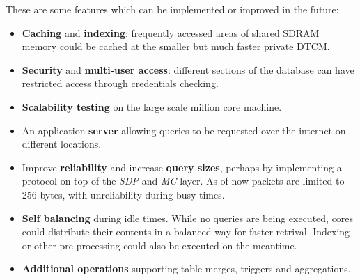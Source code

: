 These are some features which can be implemented or improved in the future:

\begin{itemize}
	\item \textbf{Caching} and \textbf{indexing}: frequently accessed areas of shared SDRAM memory could be cached at the smaller but much faster private DTCM.
	\item \textbf{Security} and \textbf{multi-user access}: different sections of the database can have restricted access through credentials checking.
	\item \textbf{Scalability testing} on the large scale million core machine.
	\item An application \textbf{server} allowing queries to be requested over the internet on different locations.
	\item Improve \textbf{reliability} and increase \textbf{query sizes}, perhaps by implementing a protocol on top of the \textit{SDP} and \textit{MC} layer. As of now packets are limited to 256-bytes, with unreliability during busy times.
	\item \textbf{Self balancing} during idle times. While no queries are being executed, cores could distribute their contents in a balanced way for faster retrival. Indexing or other pre-processing could also be executed on the meantime.
	\item \textbf{Additional operations} supporting table merges, triggers and aggregations.
\end{itemize}